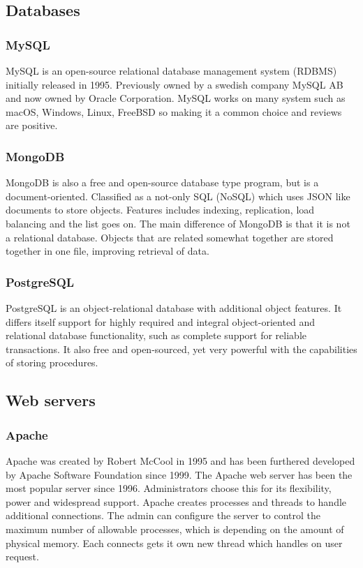 \subsection{Databases}

\subsubsection{MySQL}
MySQL \cite{sql} is an open-source relational database management system (RDBMS) initially released in 1995. Previously owned by a swedish company MySQL AB and now owned by Oracle Corporation. MySQL works on many system such as macOS, Windows, Linux, FreeBSD so making it a common choice and reviews are positive.

\subsubsection{MongoDB}
MongoDB \cite{mongoDB} is also a free and open-source database type program, but is a document-oriented. Classified as a not-only SQL (NoSQL) which uses JSON like documents to store objects. Features includes indexing, replication, load balancing and the list goes on. The main difference of MongoDB is that it is not a relational database. Objects that are related somewhat together are stored together in one file, improving retrieval of data.

\subsubsection{PostgreSQL}
PostgreSQL \cite{postgreSQL} is an object-relational database with additional object features. It differs itself support for highly required and integral object-oriented and relational database functionality, such as complete support for reliable transactions. It also free and open-sourced, yet very powerful with the capabilities of storing procedures.

\subsection{Web servers}

\subsubsection{Apache}
Apache \cite{apache} was created by Robert McCool in 1995 and has been furthered developed by Apache Software Foundation since 1999. The Apache web server has been the most popular server since 1996. Administrators choose this for its flexibility, power and widespread support. Apache creates processes and threads to handle additional connections. The admin can configure the server to control the maximum number of allowable processes, which is depending on the amount of physical memory. Each connects gets it own new thread which handles on user request.


